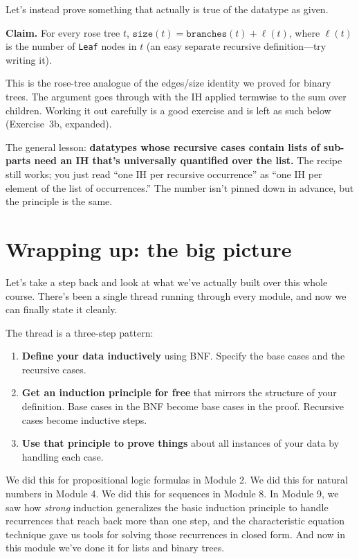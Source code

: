 \documentclass[11pt]{article}
\begin{document}
Let's instead prove something that actually is true of the datatype as given.

\textbf{Claim.} For every rose tree $t$, $\texttt{size}(t) = \texttt{branches}(t) + \ell(t)$, where $\ell(t)$ is the number of \texttt{Leaf} nodes in $t$ (an easy separate recursive definition---try writing it).

This is the rose-tree analogue of the edges/size identity we proved for binary trees. The argument goes through with the IH applied termwise to the sum over children. Working it out carefully is a good exercise and is left as such below (Exercise~3b, expanded).

The general lesson: \textbf{datatypes whose recursive cases contain lists of sub-parts need an IH that's universally quantified over the list.} The recipe still works; you just read ``one IH per recursive occurrence'' as ``one IH per element of the list of occurrences.'' The number isn't pinned down in advance, but the principle is the same.

\section{Wrapping up: the big picture}

Let's take a step back and look at what we've actually built over this whole course. There's been a single thread running through every module, and now we can finally state it cleanly.

The thread is a three-step pattern:
\begin{enumerate}
  \item \textbf{Define your data inductively} using BNF. Specify the base cases and the recursive cases.
  \item \textbf{Get an induction principle for free} that mirrors the structure of your definition. Base cases in the BNF become base cases in the proof. Recursive cases become inductive steps.
  \item \textbf{Use that principle to prove things} about all instances of your data by handling each case.
\end{enumerate}

We did this for propositional logic formulas in Module 2. We did this for natural numbers in Module 4. We did this for sequences in Module 8. In Module 9, we saw how \emph{strong} induction generalizes the basic induction principle to handle recurrences that reach back more than one step, and the characteristic equation technique gave us tools for solving those recurrences in closed form. And now in this module we've done it for lists and binary trees.
\end{document}
